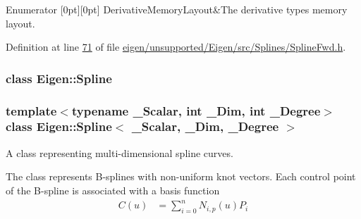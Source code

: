 \begin{DoxyEnumFields}{Enumerator}
[0pt][0pt]{}\mbox{\label{group___splines___module_a3d4de3f96ecb4755e1d7782bf8275c5daf506b7fd844ab8dfe5262f915e713b28}} 
Derivative\+Memory\+Layout&The derivative type\textquotesingle{}s memory layout. \\
\hline

\end{DoxyEnumFields}


Definition at line \hyperlink{eigen_2unsupported_2_eigen_2src_2_splines_2_spline_fwd_8h_source_l00071}{71} of file \hyperlink{eigen_2unsupported_2_eigen_2src_2_splines_2_spline_fwd_8h_source}{eigen/unsupported/\+Eigen/src/\+Splines/\+Spline\+Fwd.\+h}.

\label{class_eigen_1_1_spline}
\subsubsection{class Eigen\+:\+:Spline}
\subsubsection*{template$<$typename \+\_\+\+Scalar, int \+\_\+\+Dim, int \+\_\+\+Degree$>$\newline
class Eigen\+::\+Spline$<$ \+\_\+\+Scalar, \+\_\+\+Dim, \+\_\+\+Degree $>$}

A class representing multi-\/dimensional spline curves. 

The class represents B-\/splines with non-\/uniform knot vectors. Each control point of the B-\/spline is associated with a basis function \begin{align*} C(u) & = \sum_{i=0}^{n}N_{i,p}(u)P_i \end{align*}


